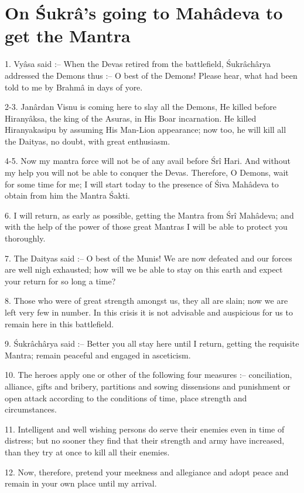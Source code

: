 ﻿\chapter{On \'Sukr\^a's going to Mah\^adeva to get the Mantra}

1. Vy\^asa said :-- When the Devas retired from the battlefield, \'Sukr\^ach\^arya addressed the Demons thus :-- O best of the Demons! Please hear, what had been told to me by Brahm\^a in days of yore.

2-3. Jan\^ardan Visnu is coming here to slay all the Demons, He killed before Hirany\^aksa, the king of the Asuras, in His Boar incarnation. He killed Hiranyakasipu by assuming His Man-Lion appearance; now too, he will kill all the Daityas, no doubt, with great enthusiasm.

4-5. Now my mantra force will not be of any avail before \'Sr\^i Hari. And without my help you will not be able to conquer the Devas. Therefore, O Demons, wait for some time for me; I will start today to the presence of \'Siva Mah\^adeva to obtain from him the Mantra \'Sakti.

6. I will return, as early as possible, getting the Mantra from \'Sr\^i Mah\^adeva; and with the help of the power of those great Mantras I will be able to protect you thoroughly.

7. The Daityas said :-- O best of the Munis! We are now defeated and our forces are well nigh exhausted; how will we be able to stay on this earth and expect your return for so long a time?

8. Those who were of great strength amongst us, they all are slain; now we are left very few in number. In this crisis it is not advisable and auspicious for us to remain here in this battlefield.

9. \'Sukr\^ach\^arya said :-- Better you all stay here until I return, getting the requisite Mantra; remain peaceful and engaged in asceticism.

10. The heroes apply one or other of the following four measures :-- conciliation, alliance, gifts and bribery, partitions and sowing dissensions and punishment or open attack according to the conditions of time, place strength and circumstances.

11. Intelligent and well wishing persons do serve their enemies even in time of distress; but no sooner they find that their strength and army have increased, than they try at once to kill all their enemies.

12. Now, therefore, pretend your meekness and allegiance and adopt peace and remain in your own place until my arrival.

